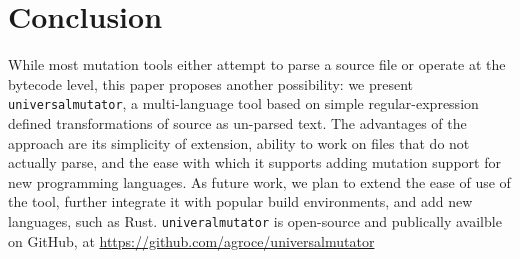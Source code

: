 \section{Conclusion}

While most mutation tools either attempt to parse a source file or
operate at the bytecode level, this paper proposes another
possibility:  we present {\tt universalmutator}, a multi-language tool based on simple regular-expression
defined transformations of source as un-parsed text.  The advantages
of the approach are its simplicity of extension, ability to work on files that do
not actually parse, and the ease with which it supports adding
mutation support for new programming languages.  As future work, we plan to extend the ease of use of the tool, further integrate it with popular build environments, and add new languages, such as Rust.
{\tt univeralmutator} is open-source and publically availble on GitHub, at \url{https://github.com/agroce/universalmutator}
